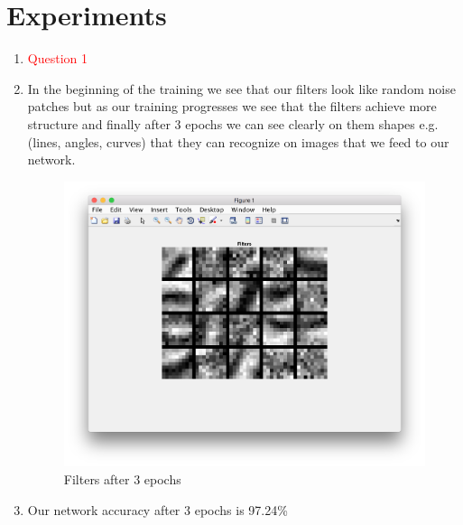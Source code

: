 \documentclass{article}
\begin{document}
\section{Experiments}
\begin{enumerate}
\item \textcolor{red}{Question 1}
\item In the beginning of the training we see that our filters look like random noise patches but as our training progresses we see that the filters achieve more structure and finally after 3 epochs we can see clearly on them shapes e.g.(lines, angles, curves) that they can recognize on images that we feed to our network.
\begin{figure}[!h]
    \centering
    \includegraphics[width=1\textwidth]{filters.png}
    \caption{Filters after 3 epochs}
    \label{fig:picture}
  \end{figure}
\item Our network accuracy after 3 epochs is 97.24\%
\end{enumerate}
\end{document}
